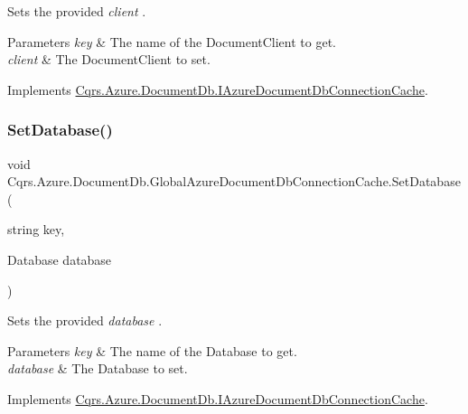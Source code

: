 Sets the provided {\itshape client} . 


\begin{DoxyParams}{Parameters}
{\em key} & The name of the Document\+Client to get.\\
\hline
{\em client} & The Document\+Client to set.\\
\hline
\end{DoxyParams}


Implements \hyperlink{interfaceCqrs_1_1Azure_1_1DocumentDb_1_1IAzureDocumentDbConnectionCache_a38d813e12b632a93a2934e2b1252f409_a38d813e12b632a93a2934e2b1252f409}{Cqrs.\+Azure.\+Document\+Db.\+I\+Azure\+Document\+Db\+Connection\+Cache}.

\mbox{\label{classCqrs_1_1Azure_1_1DocumentDb_1_1GlobalAzureDocumentDbConnectionCache_a1684f60eabfa556929fc264e0192906b_a1684f60eabfa556929fc264e0192906b}} 
\subsubsection{\texorpdfstring{Set\+Database()}{SetDatabase()}}
{\footnotesize\ttfamily void Cqrs.\+Azure.\+Document\+Db.\+Global\+Azure\+Document\+Db\+Connection\+Cache.\+Set\+Database (\begin{DoxyParamCaption}\item[{string}]{key,  }\item[{Database}]{database }\end{DoxyParamCaption})}



Sets the provided {\itshape database} . 


\begin{DoxyParams}{Parameters}
{\em key} & The name of the Database to get.\\
\hline
{\em database} & The Database to set.\\
\hline
\end{DoxyParams}


Implements \hyperlink{interfaceCqrs_1_1Azure_1_1DocumentDb_1_1IAzureDocumentDbConnectionCache_a9242c99ffb76f8ad9b15cab617056bf0_a9242c99ffb76f8ad9b15cab617056bf0}{Cqrs.\+Azure.\+Document\+Db.\+I\+Azure\+Document\+Db\+Connection\+Cache}.

